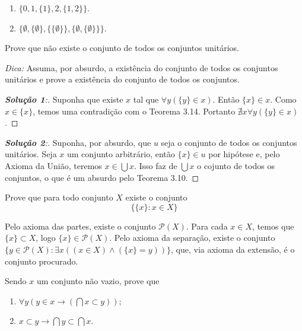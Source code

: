 \begin{enumerate}[label=(\alph{*})]
	\item $\{0,1,\{1\},2,\{1,2\}\}$.
	\item $\{\emptyset,\{\emptyset\},\{\{\emptyset\}\},\{\emptyset,\{\emptyset\}\}\}$.
\end{enumerate}


\begin{exercicio}
	Prove que não existe o conjunto de todos os conjuntos unitários.
	
	\emph{Dica:} Assuma, por absurdo, a existência do conjunto de todos os conjuntos unitários e prove a existência do conjunto de todos os conjuntos.
\end{exercicio}

\begin{proof}[\textbf{Solução 1}:]
	Suponha que existe $x$ tal que $\forall y(\{y\}\in x)$. Então $\{x\}\in x$. Como $x\in\{x\}$, temos uma contradição com o Teorema 3.14. Portanto $\nexists x\forall y(\{y\}\in x)$.
\end{proof}
	
\begin{proof}[\textbf{Solução 2}:]
	Suponha, por absurdo, que $u$ seja o conjunto de todos os conjuntos unitários. Seja $x$ um conjunto arbitrário, então $\{x\} \in u$ por hipótese e, pelo Axioma da União, teremos $x \in \bigcup x$. Isso faz de $\bigcup x$ o cojunto de todos os conjuntos, o que é um absurdo pelo Teorema 3.10.
\end{proof}
	

\begin{exercicio}
	Prove que para todo conjunto $X$ existe o conjunto
	$$\{\{x\}:x\in X\}$$
\end{exercicio}
\begin{solucao}
	Pelo axioma das partes, existe o conjunto $\mathcal{P}(X)$. Para cada $x\in X$, temos que $\{x\}\subset X$, logo $\{x\}\in\mathcal{P}(X)$. Pelo axioma da separação, existe o conjunto $\{y\in \mathcal{P}(X):\exists x((x\in X)\wedge(\{x\}=y))\}$, que, via axioma da extensão, é o conjunto procurado.
\end{solucao}

\begin{exercicio}
	Sendo $x$ um conjunto não vazio, prove que
	\begin{enumerate}[label=(\alph{*})]
		\item $\forall y(y\in x\to(\bigcap x\subset y))$;
		\item $x\subset y\to \bigcap y\subset \bigcap x$.
	\end{enumerate}
\end{exercicio}

